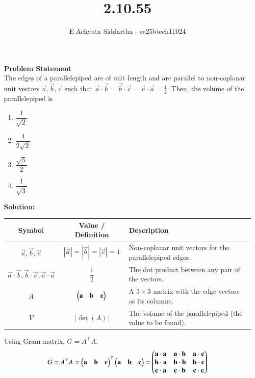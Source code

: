 \documentclass[journal]{IEEEtran}
\title{2.10.55}
\author{E Achyuta Siddartha - ee25btech11024}
\begin{document}
\maketitle

\noindent
\textbf{Problem Statement} \\
The edges of a parallelepiped are of unit length and are parallel to non-coplanar unit vectors $\vec{a}, \vec{b}, \vec{c}$ such that $\vec{a} \cdot \vec{b} = \vec{b} \cdot \vec{c} = \vec{c} \cdot \vec{a} = \frac{1}{2}$. Then, the volume of the parallelepiped is
\begin{enumerate}[label=(\alph*)]
    \item $\dfrac{1}{\sqrt{2}}$
    \item $\dfrac{1}{2\sqrt{2}}$
    \item $\dfrac{\sqrt{5}}{2}$
    \item $\dfrac{1}{\sqrt{3}}$
\end{enumerate}

\vspace{1.5em}

\noindent
\textbf{Solution:}\\
\begin{center}
    \begin{tabular}{|c|c|p{5cm}|}
    \hline
    \textbf{Symbol} & \textbf{Value / Definition} & \textbf{Description}  \\
    \hline
    $\vec{a}, \vec{b}, \vec{c}$ & $|\vec{a}|=|\vec{b}|=|\vec{c}|=1$ & Non-coplanar unit vectors for the parallelepiped edges. \\
    \hline
    $\vec{a}\cdot\vec{b}, \vec{b}\cdot\vec{c}, \vec{c}\cdot\vec{a}$ & $\dfrac{1}{2}$ & The dot product between any pair of the vectors. \\
    \hline
    $A$ & $\begin{pmatrix} \mathbf{a} & \mathbf{b} & \mathbf{c} \end{pmatrix}$ & A $3\times3$ matrix with the edge vectors as its columns. \\
    \hline
    $V$ & $|\det(A)|$ & The volume of the parallelepiped (the value to be found). \\
    \hline
    \end{tabular}
\end{center}

Using Gram matrix, $G = A^\top A$. 
\begin{align}
    G = A^\top A = 
    \begin{pmatrix}\mathbf{a} & \mathbf{b} & \mathbf{c}\end{pmatrix}^\top
    \begin{pmatrix} \mathbf{a} & \mathbf{b} & \mathbf{c} \end{pmatrix}
    = \begin{pmatrix}\mathbf{a}\cdot\mathbf{a} & \mathbf{a}\cdot\mathbf{b} & \mathbf{a}\cdot\mathbf{c} \\
             \mathbf{b}\cdot\mathbf{a} & \mathbf{b}\cdot\mathbf{b} & \mathbf{b}\cdot\mathbf{c} \\
             \mathbf{c}\cdot\mathbf{a} & \mathbf{c}\cdot\mathbf{b} & \mathbf{c}\cdot\mathbf{c}\end{pmatrix}
\end{align}
\end{document}

